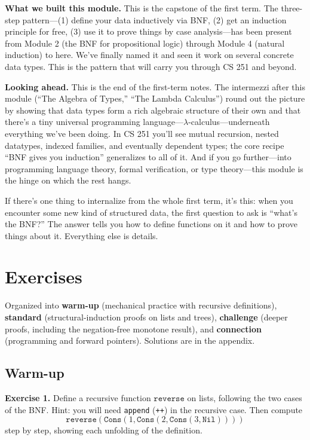\documentclass[11pt]{article}
\begin{document}
\begin{summarybox}
\textbf{What we built this module.} This is the capstone of the first term. The three-step pattern---(1) define your data inductively via BNF, (2) get an induction principle for free, (3) use it to prove things by case analysis---has been present from Module 2 (the BNF for propositional logic) through Module 4 (natural induction) to here. We've finally named it and seen it work on several concrete data types. This is the pattern that will carry you through CS 251 and beyond.

\medskip
\textbf{Looking ahead.} This is the end of the first-term notes. The intermezzi after this module (``The Algebra of Types,'' ``The Lambda Calculus'') round out the picture by showing that data types form a rich algebraic structure of their own and that there's a tiny universal programming language---$\lambda$-calculus---underneath everything we've been doing. In CS 251 you'll see mutual recursion, nested datatypes, indexed families, and eventually dependent types; the core recipe ``BNF gives you induction'' generalizes to all of it. And if you go further---into programming language theory, formal verification, or type theory---this module is the hinge on which the rest hangs.

If there's one thing to internalize from the whole first term, it's this: when you encounter some new kind of structured data, the first question to ask is ``what's the BNF?'' The answer tells you how to define functions on it and how to prove things about it. Everything else is details.
\end{summarybox}

\section{Exercises}

Organized into \textbf{warm-up} (mechanical practice with recursive definitions), \textbf{standard} (structural-induction proofs on lists and trees), \textbf{challenge} (deeper proofs, including the negation-free monotone result), and \textbf{connection} (programming and forward pointers). Solutions are in the appendix.

\subsection*{Warm-up}

\textbf{Exercise 1.}\label{ex:m10:1} Define a recursive function
$\texttt{reverse}$ on lists, following the two cases of the BNF. Hint:
you will need \texttt{append} (\texttt{++}) in the recursive case. Then
compute
\[
  \texttt{reverse}(\texttt{Cons}(1,
    \texttt{Cons}(2, \texttt{Cons}(3, \texttt{Nil}))))
\]
step by step, showing each unfolding of the definition.
\end{document}
